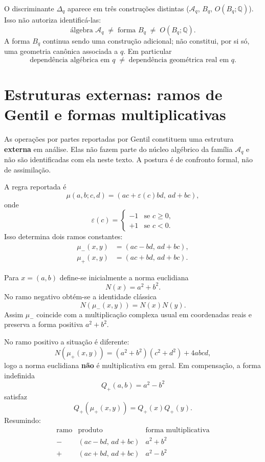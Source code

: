 \documentclass[11pt,a4paper]{article}
\begin{document}
O discriminante \(\Delta_q\) aparece em três construções distintas
(\(\mathcal{A}_q\), \(B_q\), \(O(B_q;\mathbb{Q})\)). Isso não autoriza
identificá-las:
\[
\boxed{
\text{álgebra }\mathcal{A}_q
\;\neq\;
\text{forma }B_q
\;\neq\;
O(B_q;\mathbb{Q}).
}
\]
A forma \(B_q\) continua sendo uma construção adicional; não constitui,
por si só, uma geometria canônica associada a \(q\). Em particular
\[
\boxed{
\text{dependência algébrica em }q
\;\neq\;
\text{dependência geométrica real em }q.
}
\]

\section{Estruturas externas: ramos de Gentil e formas multiplicativas}

As operações por partes reportadas por Gentil constituem uma estrutura
\textbf{externa} em análise. Elas não fazem parte do núcleo algébrico da
família \(\mathcal{A}_q\) e não são identificadas com ela neste texto.
A postura é de confronto formal, não de assimilação.

A regra reportada é
\[
\mu(a,b;c,d)=(ac+\varepsilon(c)bd,\,ad+bc),
\]
onde
\[
\varepsilon(c)=\begin{cases}
-1 & \text{se }c\ge0,\\
+1 & \text{se }c<0.
\end{cases}
\]
Isso determina dois ramos constantes:
\begin{align*}
\mu_-(x,y)&=(ac-bd,\,ad+bc),\\
\mu_+(x,y)&=(ac+bd,\,ad+bc).
\end{align*}

Para \(x=(a,b)\) define-se inicialmente a norma euclidiana
\[
N(x)=a^2+b^2.
\]
No ramo negativo obtém-se a identidade clássica
\[
N(\mu_-(x,y))=N(x)N(y).
\]
Assim \(\mu_-\) coincide com a multiplicação complexa usual em coordenadas
reais e preserva a forma positiva \(a^2+b^2\).

No ramo positivo a situação é diferente:
\[
N(\mu_+(x,y))=(a^2+b^2)(c^2+d^2)+4abcd,
\]
logo a norma euclidiana \textbf{não} é multiplicativa em geral. Em
compensação, a forma indefinida
\[
Q_+(a,b)=a^2-b^2
\]
satisfaz
\[
Q_+(\mu_+(x,y))=Q_+(x)Q_+(y).
\]
Resumindo:
\[
\begin{array}{c|c|c}
\text{ramo} & \text{produto} & \text{forma multiplicativa}\\
\hline
- & (ac-bd,\,ad+bc) & a^2+b^2\\
+ & (ac+bd,\,ad+bc) & a^2-b^2
\end{array}
\]
\end{document}
